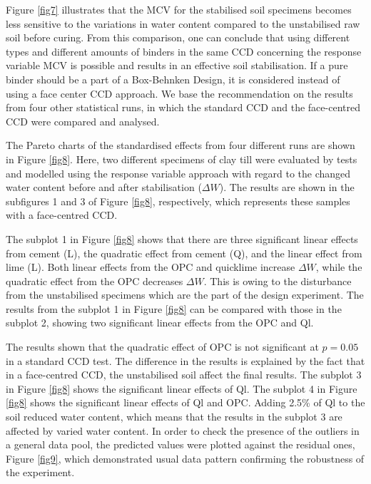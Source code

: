 \documentclass[eprint,
]{actapoly}
\begin{document}
Figure \ref{fig7} illustrates that the MCV for the stabilised soil specimens becomes less sensitive to the variations in water content compared to the unstabilised raw soil before curing. From this comparison, one can conclude that using different types and different amounts of binders in the same CCD concerning the response variable MCV is possible and results in an effective soil stabilisation. If a pure binder should be a part of a Box-Behnken Design, it is considered instead of using a face center CCD approach. We base the recommendation on the results from four other statistical runs, in which the standard CCD and the face-centred CCD were compared and analysed. 

The Pareto charts of the standardised effects from four different runs are shown in Figure \ref{fig8}. Here, two different specimens of clay till were evaluated by tests and modelled using the response variable approach with regard to the changed water content before and after stabilisation ($\Delta W$). The results are shown in the subfigures 1 and 3 of Figure \ref{fig8}, respectively, which represents these samples with a face-centred CCD. 

The subplot 1 in Figure \ref{fig8} shows that there are three significant linear effects from cement (L), the quadratic effect from cement (Q), and the linear effect from lime (L). Both linear effects from the OPC and quicklime increase $\Delta W$, while the quadratic effect from the OPC decreases $\Delta W$. This is owing to the disturbance from the unstabilised specimens which are the part of the design experiment. The results from the subplot 1 in Figure \ref{fig8} can be compared with those in the subplot 2, showing two significant linear effects from the OPC and Ql. 

The results shown that the quadratic effect of OPC is not significant at $p=0.05$ in a standard CCD test. The difference in the results is explained by the fact that in a face-centred CCD, the unstabilised soil affect the final results. The subplot 3 in Figure \ref{fig8} shows the significant linear effects of Ql. The subplot 4 in Figure \ref{fig8} shows the significant linear effects of Ql and OPC. Adding 2.5\% of Ql to the soil reduced water content, which means that the results in the subplot 3 are affected by varied water content. In order to check the presence of the outliers in a general data pool, the predicted values were plotted against the residual ones, Figure \ref{fig9}, which demonstrated usual data pattern confirming the robustness of the experiment. 
\end{document}
